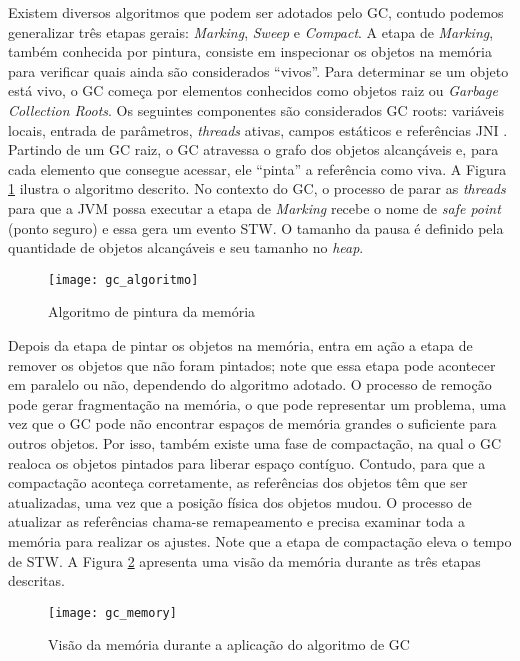 Existem diversos algoritmos que podem ser adotados pelo GC, contudo podemos
generalizar três etapas gerais: \emph{Marking}, \emph{Sweep} e
\emph{Compact}. A etapa de \emph{Marking}, também conhecida por pintura,
consiste em inspecionar os objetos na memória para verificar quais ainda são
considerados ``vivos''. Para determinar se um objeto está vivo, o GC começa por
elementos conhecidos como objetos raiz ou \emph{Garbage Collection Roots}. Os
seguintes componentes são considerados GC roots: variáveis locais,
entrada de parâmetros, \emph{threads} ativas, campos estáticos e referências JNI
\citep{gc_basics}. Partindo de um GC raiz, o GC atravessa o grafo dos objetos
alcançáveis e, para cada elemento que consegue acessar, ele ``pinta'' a referência
como viva. A Figura \ref{fig:gc_alg} ilustra o algoritmo descrito. No contexto
do GC, o processo de parar as \emph{threads} para que a JVM possa executar a etapa de
\emph{Marking} recebe o nome de \emph{safe point} (ponto seguro) e essa
gera um evento STW. O tamanho da pausa é definido pela quantidade de objetos
alcançáveis e seu tamanho no \emph{heap}.

\begin{figure}[!h]
  \centering
  \texttt{[image: gc\_algoritmo]}
	\caption[Algoritmo de pintura da memória]{Algoritmo de pintura da memória\citep{gc_basics}}
  \label{fig:gc_alg}
\end{figure}

Depois da etapa de pintar os objetos na memória, entra em ação a etapa de
remover os objetos que não foram pintados; note que essa etapa pode acontecer
em paralelo ou não, dependendo do algoritmo adotado. O processo de remoção pode
gerar fragmentação na memória, o que pode representar um problema, uma vez que o
GC pode não encontrar espaços de memória grandes o suficiente para outros
objetos. Por isso, também existe uma fase de compactação, na qual o GC realoca os
objetos pintados para liberar espaço contíguo. Contudo, para que a compactação
aconteça corretamente, as referências dos objetos têm que ser atualizadas, uma
vez que a posição física dos objetos mudou. O processo de atualizar as
referências chama-se remapeamento e precisa examinar toda a memória para
realizar os ajustes. Note que a etapa de compactação eleva o tempo de STW. A
Figura \ref{fig:gc_mem} apresenta uma visão da memória durante as três etapas
descritas.

\begin{figure}[!h]
  \centering
  \texttt{[image: gc\_memory]}
	\caption[Visão da memória durante a aplicação do algoritmo de GC]{Visão da memória durante a aplicação do algoritmo de GC\citep{gc_basics}}
  \label{fig:gc_mem}
\end{figure}

